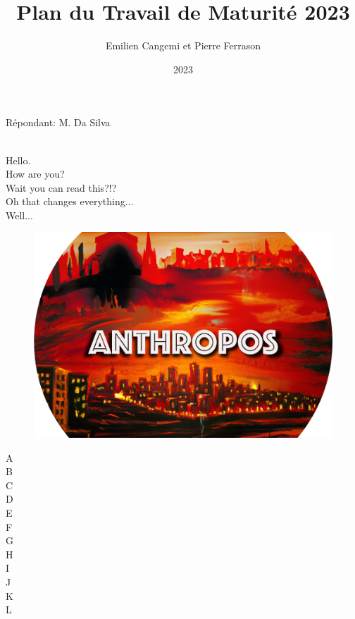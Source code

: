 \documentclass{article}
\title{Plan du Travail de Maturité 2023}
\author{Emilien Cangemi et Pierre Ferrason}
\date{2023}
\begin{document}
\setul{0.5ex}{0.3ex}

\setul{0.5ex}{0.3ex}

\setul{0.5ex}{0.3ex}


\maketitle

\begin{center}
    Répondant: M. Da Silva \\
\end{center} 

\\
\color{white}
    Hello. \\
    How are you?\\
    Wait you can read this?!?\\
    Oh that changes everything...\\
    Well...\\
\color{black}

\begin{center}
    \begin{figure}[h]
        \centering
            \includegraphics[scale=0.6]{image_logo_anthropos.png}
    \end{figure}
\end{center}

\color{white}
    A\\B\\C\\D\\E\\F\\G\\H\\I\\J\\K\\L\\
\color{black}
\end{document}
